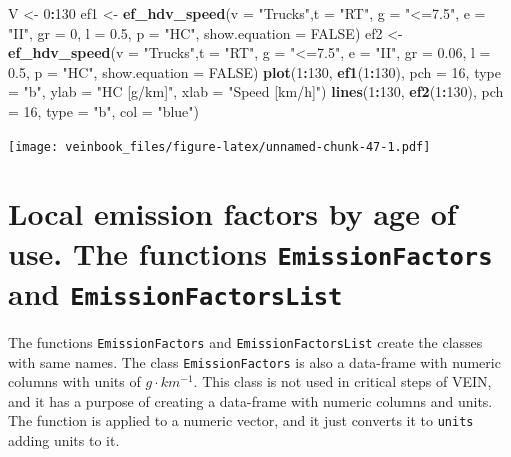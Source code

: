 \documentclass[12pt,graybox,envcountchap,sectrefs]{krantz}
\makeatletter
\newenvironment{Shaded}{\begin{snugshade}}{\end{snugshade}}
\newcommand{\KeywordTok}[1]{\textcolor[rgb]{0.13,0.29,0.53}{\textbf{#1}}}
\newcommand{\DataTypeTok}[1]{\textcolor[rgb]{0.13,0.29,0.53}{#1}}
\newcommand{\DecValTok}[1]{\textcolor[rgb]{0.00,0.00,0.81}{#1}}
\newcommand{\FloatTok}[1]{\textcolor[rgb]{0.00,0.00,0.81}{#1}}
\newcommand{\StringTok}[1]{\textcolor[rgb]{0.31,0.60,0.02}{#1}}
\newcommand{\OtherTok}[1]{\textcolor[rgb]{0.56,0.35,0.01}{#1}}
\newcommand{\OperatorTok}[1]{\textcolor[rgb]{0.81,0.36,0.00}{\textbf{#1}}}
\newcommand{\NormalTok}[1]{#1}
\newenvironment{kframe}{%
\medskip{}
\setlength{\fboxsep}{.8em}
 \def\at@end@of@kframe{}%
 \ifinner\ifhmode%
  \def\at@end@of@kframe{\end{minipage}}%
  \begin{minipage}{\columnwidth}%
 \fi\fi%
 \def\FrameCommand##1{\hskip\@totalleftmargin \hskip-\fboxsep
 \colorbox{shadecolor}{##1}\hskip-\fboxsep
     \hskip-\linewidth \hskip-\@totalleftmargin \hskip\columnwidth}%
 \MakeFramed {\advance\hsize-\width
   \@totalleftmargin\z@ \linewidth\hsize
   \@setminipage}}%
 {\par\unskip\endMakeFramed%
 \at@end@of@kframe}
\renewenvironment{Shaded}{\begin{kframe}}{\end{kframe}}
\theoremstyle{definition}
\theoremstyle{definition}
\theoremstyle{definition}
\theoremstyle{remark}
\makeatother
\begin{document}
\begin{Shaded}
\begin{Highlighting}[]
\NormalTok{V <-}\StringTok{ }\DecValTok{0}\OperatorTok{:}\DecValTok{130}
\NormalTok{ef1 <-}\StringTok{ }\KeywordTok{ef_hdv_speed}\NormalTok{(}\DataTypeTok{v =} \StringTok{"Trucks"}\NormalTok{,}\DataTypeTok{t =} \StringTok{"RT"}\NormalTok{, }\DataTypeTok{g =} \StringTok{"<=7.5"}\NormalTok{,}
                    \DataTypeTok{e =} \StringTok{"II"}\NormalTok{, }\DataTypeTok{gr =} \DecValTok{0}\NormalTok{,}
\DataTypeTok{l =} \FloatTok{0.5}\NormalTok{, }\DataTypeTok{p =} \StringTok{"HC"}\NormalTok{, }\DataTypeTok{show.equation =} \OtherTok{FALSE}\NormalTok{)}
\NormalTok{ef2 <-}\StringTok{ }\KeywordTok{ef_hdv_speed}\NormalTok{(}\DataTypeTok{v =} \StringTok{"Trucks"}\NormalTok{,}\DataTypeTok{t =} \StringTok{"RT"}\NormalTok{, }\DataTypeTok{g =} \StringTok{"<=7.5"}\NormalTok{,}
                    \DataTypeTok{e =} \StringTok{"II"}\NormalTok{, }\DataTypeTok{gr =} \FloatTok{0.06}\NormalTok{,}
\DataTypeTok{l =} \FloatTok{0.5}\NormalTok{, }\DataTypeTok{p =} \StringTok{"HC"}\NormalTok{, }\DataTypeTok{show.equation =} \OtherTok{FALSE}\NormalTok{)}
\KeywordTok{plot}\NormalTok{(}\DecValTok{1}\OperatorTok{:}\DecValTok{130}\NormalTok{, }\KeywordTok{ef1}\NormalTok{(}\DecValTok{1}\OperatorTok{:}\DecValTok{130}\NormalTok{), }\DataTypeTok{pch =} \DecValTok{16}\NormalTok{, }\DataTypeTok{type =} \StringTok{"b"}\NormalTok{,}
     \DataTypeTok{ylab =} \StringTok{"HC [g/km]"}\NormalTok{, }\DataTypeTok{xlab =} \StringTok{"Speed [km/h]"}\NormalTok{)}
\KeywordTok{lines}\NormalTok{(}\DecValTok{1}\OperatorTok{:}\DecValTok{130}\NormalTok{, }\KeywordTok{ef2}\NormalTok{(}\DecValTok{1}\OperatorTok{:}\DecValTok{130}\NormalTok{), }\DataTypeTok{pch =} \DecValTok{16}\NormalTok{, }\DataTypeTok{type =} \StringTok{"b"}\NormalTok{, }\DataTypeTok{col =} \StringTok{"blue"}\NormalTok{)}
\end{Highlighting}
\end{Shaded}

\texttt{[image: veinbook\_files/figure-latex/unnamed-chunk-47-1.pdf]}

\section{\texorpdfstring{Local emission factors by age of use. The
functions \texttt{EmissionFactors} and
\texttt{EmissionFactorsList}}{Local emission factors by age of use. The functions EmissionFactors and EmissionFactorsList}}\label{localef}

The functions \texttt{EmissionFactors} and \texttt{EmissionFactorsList}
create the classes with same names. The class \texttt{EmissionFactors}
is also a data-frame with numeric columns with units of
\(g \cdot km^{-1}\). This class is not used in critical steps of VEIN,
and it has a purpose of creating a data-frame with numeric columns and
units. The function is applied to a numeric vector, and it just converts
it to \texttt{units} adding units to it.
\end{document}
